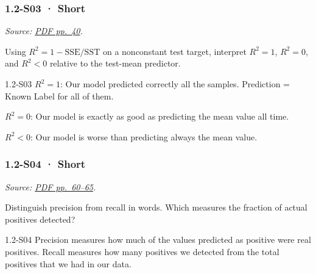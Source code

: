 \noindent\begin{minipage}{\linewidth}

\subsubsection{1.2-S03 · Short}\label{s03-short-1}

\emph{Source:
\href{../Lecture\%20Slides/1.2.\%20Shallow\%20Learning.pdf\#page=40}{PDF
pp.~40}.}

Using \(R^2=1-\mathrm{SSE}/\mathrm{SST}\) on a nonconstant test target,
interpret \(R^2=1\), \(R^2=0\), and \(R^2<0\) relative to the test-mean
predictor.

\begin{solution}[20mm]{1.2-S03}
$R^2 = 1$: Our model predicted correctly all the samples. Prediction = Known Label for all of them.

$R^2 = 0$: Our model is exactly as good as predicting the mean value all time.

$R^2 < 0$: Our model is worse than predicting always the mean value.

\end{solution}
\end{minipage}\par\medskip

\noindent\begin{minipage}{\linewidth}

\subsubsection{1.2-S04 · Short}\label{s04-short-1}

\emph{Source:
\href{../Lecture\%20Slides/1.2.\%20Shallow\%20Learning.pdf\#page=60}{PDF
pp.~60--65}.}

Distinguish precision from recall in words. Which measures the fraction
of actual positives detected?

\begin{solution}[20mm]{1.2-S04}
Precision measures how much of the values predicted as positive were real positives. Recall measures how many positives we detected from the total positives that we had in our data.
\end{solution}
\end{minipage}\par\medskip

